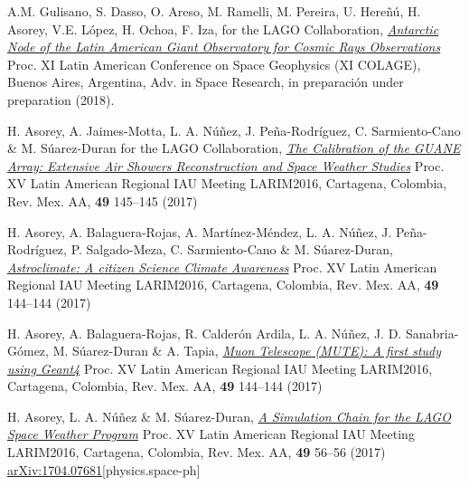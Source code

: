 \begin{etaremune}
\item {} A.M. Gulisano, S. Dasso, O. Areso, M. Ramelli, M. Pereira, U. Hereñú, H. Asorey, V.E. López, H. Ochoa, F. Iza, for the LAGO Collaboration, \href{}{\emph{Antarctic Node of the Latin American Giant Observatory for Cosmic Rays Observations}} \en Proc. XI Latin American Conference on Space Geophysics (XI COLAGE),  Buenos Aires, Argentina, Adv. in Space Research, \ifeng in preparación \else under preparation \fi (2018). %

\item {} H. Asorey, A. Jaimes-Motta, L. A. Núñez, J. Peña-Rodríguez, C. Sarmiento-Cano \& M. Súarez-Duran for the LAGO Collaboration, \href{http://www.astroscu.unam.mx/rmaa/RMxAC..49/PDF/RMxAC..49\_poster3.pdf}{\emph{The Calibration of the GUANE Array: Extensive Air Showers Reconstruction and Space Weather Studies}} \en Proc. XV Latin American Regional IAU Meeting LARIM2016, Cartagena, Colombia, Rev. Mex. AA, {\bf{49}} 145--145 (2017)

\item {} H. Asorey, A. Balaguera-Rojas, A. Martínez-Méndez, L. A. Núñez, J. Peña-Rodríguez, P. Salgado-Meza, C. Sarmiento-Cano \& M. Súarez-Duran, \href{http://www.astroscu.unam.mx/rmaa/RMxAC..49/PDF/RMxAC..49\_poster2.pdf}{\emph{Astroclimate: A citizen Science Climate Awareness}} \en Proc. XV Latin American Regional IAU Meeting LARIM2016, Cartagena, Colombia, Rev. Mex. AA, {\bf{49}} 144--144 (2017)


\item {} H. Asorey, A. Balaguera-Rojas, R. Calderón Ardila, L. A. Núñez, J. D. Sanabria-Gómez, M. Súarez-Duran \& A. Tapia, \href{http://www.astroscu.unam.mx/rmaa/RMxAC..49/PDF/RMxAC..49\_poster2.pdf}{\emph{Muon Telescope (MUTE): A first study using Geant4}} \en Proc. XV Latin American Regional IAU Meeting LARIM2016, Cartagena, Colombia, Rev. Mex. AA, {\bf{49}} 144--144 (2017)

\item {} H. Asorey, L. A. Núñez \& M. Súarez-Duran, \href{http://www.astroscu.unam.mx/rmaa/RMxAC..49/PDF/RMxAC..49\_oral6.pdf}{\emph{A Simulation Chain for the LAGO Space Weather Program}} \en Proc. XV Latin American Regional IAU Meeting LARIM2016, Cartagena, Colombia, Rev. Mex. AA, {\bf{49}} 56--56 (2017) \href{http://arxiv.org/abs/1704.07681}{arXiv:1704.07681}[physics.space-ph]


\end{etaremune}
